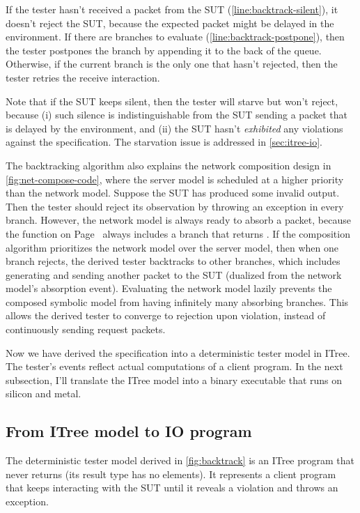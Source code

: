 \begin{enumerate}
  If the tester hasn't received a packet from the SUT
  (\autoref{line:backtrack-silent}), it doesn't reject the SUT, because the
  expected packet might be delayed in the environment.  If there are 
  branches to evaluate (\autoref{line:backtrack-postpone}), then the tester
  postpones the  branch by appending it to the back of the queue.
  Otherwise, if the current branch is the only one that hasn't rejected, then
  the tester retries the receive interaction.

  Note that if the SUT keeps silent, then the tester will starve but won't
  reject, because (i) such silence is indistinguishable from the SUT sending a
  packet that is delayed by the environment, and (ii) the SUT hasn't {\em
  exhibited} any violations against the specification.  The starvation issue is
  addressed in \autoref{sec:itree-io}.
\end{enumerate}

The backtracking algorithm also explains the network composition design
in \autoref{fig:net-compose-code}, where the server model is scheduled at a
higher priority than the network model.  Suppose the SUT has produced some
invalid output.  Then the tester should reject its observation by throwing an
exception in every branch.  However, the network model is always ready to absorb
a packet, because the  function on Page~\pageref{def:pick-one}
always includes a branch that returns .  If the composition algorithm
prioritizes the network model over the server model, then when one branch
rejects, the derived tester backtracks to other branches, which includes
generating and sending another packet to the SUT (dualized from the network
model's absorption event).  Evaluating the network model lazily prevents the
composed symbolic model from having infinitely many absorbing branches.  This
allows the derived tester to converge to rejection upon violation, instead of
continuously sending request packets.

Now we have derived the specification into a deterministic tester model in
ITree.  The tester's events reflect actual computations of a client program.  In
the next subsection, I'll translate the ITree model into a binary executable
that runs on silicon and metal.

\subsection{From ITree model to IO program}
\label{sec:itree-io}
The deterministic tester model derived in \autoref{fig:backtrack} is an ITree
program that never returns (its result type  has no elements).  It
represents a client program that keeps interacting with the SUT until it reveals
a violation and throws an exception.

